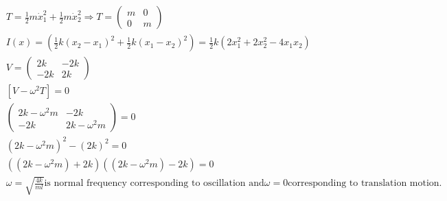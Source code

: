 \begin{enumerate}
\begin{answer}
\begin{align*}
	&T=\frac{1}{2} m \dot{x}_{1}^{2}+\frac{1}{2} m \dot{x}_{2}^{2} \Rightarrow T=\left(\begin{array}{cc}
	m & 0 \\
	0 & m
	\end{array}\right)\\
	&I(x)=\left(\frac{1}{2} k\left(x_{2}-x_{1}\right)^{2}+\frac{1}{2} k\left(x_{1}-x_{2}\right)^{2}\right)=\frac{1}{2} k\left(2 x_{1}^{2}+2 x_{2}^{2}-4 x_{1} x_{2}\right)\\
	&V=\left(\begin{array}{cc}
	2 k & -2 k \\
	-2 k & 2 k
	\end{array}\right)\\
	&\left[V-\omega^{2} T\right]=0\\
	&\left(\begin{array}{cc}
	2 k-\omega^{2} m & -2 k \\
	-2 k & 2 k-\omega^{2} m
	\end{array}\right)=0\\
	&\left(2 k-\omega^{2} m\right)^{2}-(2 k)^{2}=0\\
	&\left(\left(2 k-\omega^{2} m\right)+2 k\right)\left(\left(2 k-\omega^{2} m\right)-2 k\right)=0\\
	&\omega=\sqrt{\frac{4 k}{m l}} \text{is normal frequency corresponding to oscillation and} \omega=0 \text{corresponding
		to translation motion.}
	\end{align*}
\end{answer}
\end{enumerate}